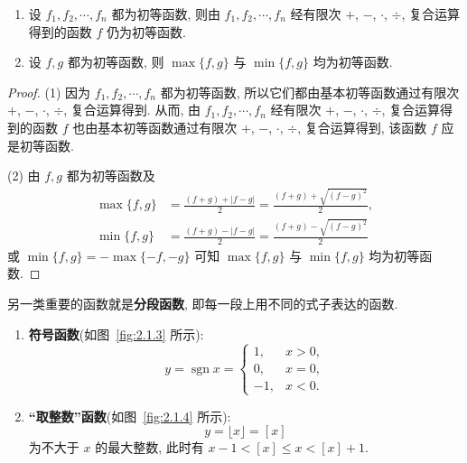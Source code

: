 \begin{example}\label{ex:2.1.2}
\begin{enumerate}[label=(\arabic*)]
  \item 设 $f_{1}, f_{2}, \cdots, f_{n}$ 都为初等函数, 则由 $f_{1}, f_{2}, \cdots, f_{n}$ 经有限次 $+$, $-$, $\cdot$, $\div$, 复合运算得到的函数 $f$ 仍为初等函数.
  \item 设 $f, g$ 都为初等函数, 则 $\max\{f, g\}$ 与 $\min\{f, g\}$ 均为初等函数.
\end{enumerate}
\end{example}

\begin{proof}
(1) 因为 $f_{1}, f_{2}, \cdots, f_{n}$ 都为初等函数, 所以它们都由基本初等函数通过有限次 $+$, $-$, $\cdot$, $\div$, 复合运算得到. 从而, 由 $f_{1}, f_{2}, \cdots, f_{n}$ 经有限次 $+$, $-$, $\cdot$, $\div$, 复合运算得到的函数 $f$ 也由基本初等函数通过有限次 $+$, $-$, $\cdot$, $\div$, 复合运算得到, 该函数 $f$ 应是初等函数.

(2) 由 $f, g$ 都为初等函数及
\begin{align*}
\max\{f,g\} &= \frac{(f+g)+|f-g|}{2}=\frac{(f+g)+\sqrt{(f-g)^2}}{2}, \\
\min\{f,g\} &= \frac{(f+g)-|f-g|}{2}=\frac{(f+g)-\sqrt{(f-g)^2}}{2}
\end{align*}
或 $\min\{f,g\} = -\max\{-f,-g\}$ 可知 $\max\{f,g\}$ 与 $\min\{f,g\}$ 均为初等函数.
\end{proof}

另一类重要的函数就是\textbf{分段函数}, 即每一段上用不同的式子表达的函数.

\begin{example}\label{ex:2.1.3}
\begin{enumerate}[label=(\arabic*)]
  \item \textbf{符号函数}(如图~\ref{fig:2.1.3} 所示):
  \[
  y=\operatorname{sgn} x=\begin{cases}
  1, & x>0, \\
  0, & x=0, \\
  -1, & x<0.
\end{cases}
\]
  \item \textbf{“取整数”函数}(如图~\ref{fig:2.1.4} 所示):
  \[
  y=\lfloor x\rfloor = [x]
\]
  为不大于 $x$ 的最大整数, 此时有 $x-1<[x]\leqslant x<[x]+1$.
\end{enumerate}
\end{example}

